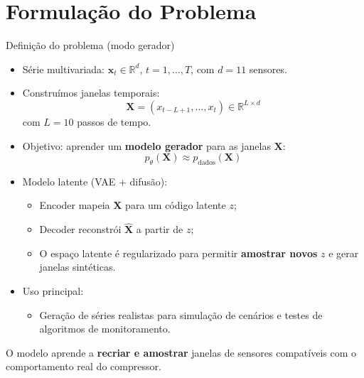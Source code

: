 \documentclass[10pt,aspectratio=169]{beamer}
\begin{document}
\section{Formulação do Problema}

\begin{frame}{Definição do problema (modo gerador)}

  \begin{itemize}
    \item Série multivariada: \(\mathbf{x}_t \in \mathbb{R}^{d}\), \(t = 1,\dots,T\), com \(d = 11\) sensores.
    \item Construímos janelas temporais:
      \[
        \mathbf{X} = (x_{t-L+1}, \dots, x_t) \in \mathbb{R}^{L \times d}
      \]
      com \(L = 10\) passos de tempo.
    \item Objetivo: aprender um \textbf{modelo gerador} para as janelas \(\mathbf{X}\):
      \[
        p_{\theta}(\mathbf{X}) \approx p_{\text{dados}}(\mathbf{X})
      \]
    \item Modelo latente (VAE + difusão):
      \begin{itemize}
        \item Encoder mapeia \(\mathbf{X}\) para um código latente \(z\);
        \item Decoder reconstrói \(\hat{\mathbf{X}}\) a partir de \(z\);
        \item O espaço latente é regularizado para permitir \textbf{amostrar novos} \(z\) e gerar janelas sintéticas.
      \end{itemize}
    \item Uso principal:
      \begin{itemize}
        \item Geração de séries realistas para simulação de cenários
              e testes de algoritmos de monitoramento.
      \end{itemize}
  \end{itemize}

  \vspace{0.3cm}
  \noindent O modelo aprende a \textbf{recriar e amostrar} janelas de sensores compatíveis
  com o comportamento real do compressor.
\end{frame}
\end{document}
